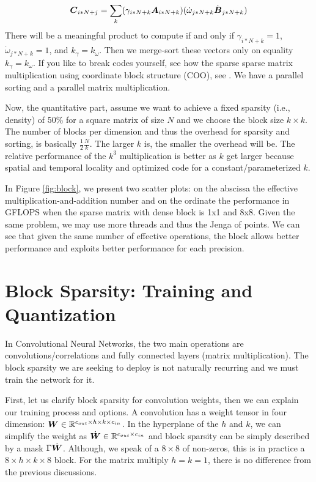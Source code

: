 \documentclass[conference]{IEEEtran}
\begin{document}
\begin{equation}
  {\boldsymbol C}_{i*N+j} = \sum_k ( \gamma_{i*N+k} {\boldsymbol A}_{i*N+k} ) (\dot{\omega}_{j*N+k} \dot{{\boldsymbol B}}_{j*N+k})
\end{equation}
There will be a meaningful product to compute if and only if
$\gamma_{i*N+k} =1$, $\dot{\omega}_{j*N+k} =1$, and
$k_\gamma=k_\omega$.  Then we merge-sort these vectors only on
equality $k_\gamma = k_\omega$. If you like to break codes yourself,
see how the sparse sparse matrix multiplication using coordinate block
structure (COO), see \cite{PaoloG2020}. We have a parallel sorting and
a parallel matrix multiplication.

Now, the quantitative part, assume we want to achieve a fixed sparsity
(i.e., density) of 50\% for a square matrix of size $N$ and we choose
the block size $k \times k$. The number of blocks per dimension and
thus the overhead for sparsity and sorting, is basically
$\frac{1}{2}\frac{N}{k}$. The larger $k$ is, the smaller the overhead
will be.  The relative performance of the $k^3$ multiplication is
better as $k$ get larger because spatial and temporal locality and
optimized code for a constant/parameterized $k$.


In Figure \ref{fig:block}, we present two scatter plots: on the
abscissa the effective multiplication-and-addition number and on the
ordinate the performance in GFLOPS when the sparse matrix with dense
block is 1x1 and 8x8. Given the same problem, we may use more threads
and thus the Jenga of points.  We can see that given the same number
of effective operations, the block allows better performance and
exploits better performance for each precision.



\section{Block Sparsity: Training and Quantization}
\label{sec:training}

In Convolutional Neural Networks, the two main operations are
convolutions/correlations and fully connected layers (matrix
multiplication). The block sparsity we are seeking to deploy is not
naturally recurring and  we must train the network for it.

First, let us clarify block sparsity for convolution weights, then we
can explain our training process and options. A convolution has a
weight tensor in four dimension: ${\boldsymbol W} \in \mathbb{R}^{c_{out}\times h
  \times k \times c_{in}}$. In the hyperplane of the $h$ and $k$, we
can simplify the weight as $\dot{{\boldsymbol W}} \in \mathbb{R}^{c_{out} \times
  c_{in}}$ and block sparsity can be simply described by a mask
$\Gamma\dot{{\boldsymbol W}}$. Although, we speak of a $8\times 8$ of
non-zeros, this is in practice a $8\times h\times k\times 8$
block. For the matrix multiply $h=k=1$, there is no difference from
the previous discussions.
\end{document}
